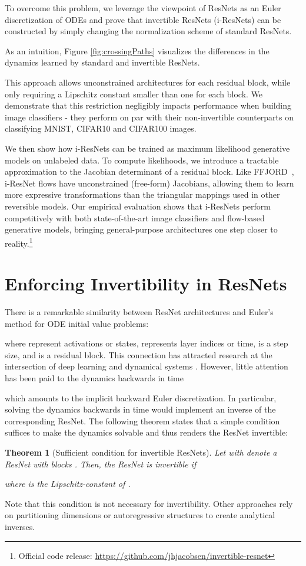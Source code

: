 \documentclass{article}
\newtheorem{theorem}{Theorem}
\begin{document}
To overcome this problem, we leverage the viewpoint of ResNets as an Euler discretization of ODEs \citep{haberRuthotto, ruthottoHaber, luODE, naisnet} and prove that invertible ResNets (i-ResNets) can be constructed by simply changing the normalization scheme of standard ResNets. 

As an intuition, Figure \ref{fig:crossingPaths} visualizes the differences in the dynamics learned by standard and invertible ResNets. 

This approach allows unconstrained architectures for each residual block, while only requiring a Lipschitz constant smaller than one for each block. We demonstrate that this restriction negligibly impacts performance when building image classifiers - they perform on par with their non-invertible counterparts on classifying MNIST, CIFAR10 and CIFAR100 images. 

We then show how i-ResNets can be trained as maximum likelihood generative models on unlabeled data. To compute likelihoods, we introduce a tractable approximation to the Jacobian determinant of a residual block. Like FFJORD~\cite{ffjord}, i-ResNet flows have unconstrained (free-form) Jacobians, allowing them to learn more expressive transformations than the triangular mappings used in other reversible models. Our empirical evaluation shows that i-ResNets perform competitively with both state-of-the-art image classifiers and flow-based generative models, bringing general-purpose architectures one step closer to reality.\footnote{Official code release: \url{https://github.com/jhjacobsen/invertible-resnet}}


\section{Enforcing Invertibility in ResNets}
There is a remarkable similarity between ResNet architectures and Euler's method for ODE initial value problems:

where  represent activations or states,  represents layer indices or time,  is a step size, and  is a residual block.
This connection has attracted research at the intersection of deep learning and dynamical systems \citep{luODE, haberRuthotto, ruthottoHaber, chen2018neural}.
However, little attention has been paid to the dynamics backwards in time 

which amounts to the implicit backward Euler discretization. In particular, solving the dynamics backwards in time would implement an inverse of the corresponding ResNet.
The following theorem states that a simple condition suffices to make the dynamics solvable and thus renders the ResNet invertible:
\begin{theorem}[Sufficient condition for invertible ResNets]
\label{thm:invertibility}
Let  with  denote a ResNet with blocks . Then, the ResNet  is invertible if

where  is the Lipschitz-constant of .
\end{theorem}
Note that this condition is not necessary for invertibility.
Other approaches \citep{dinh2014nice, dinh2016density, jacobsen2018irevnet, Chang2018ReversibleAF, kingma2018glow} rely on partitioning dimensions or autoregressive structures to create analytical inverses. 
\end{document}

